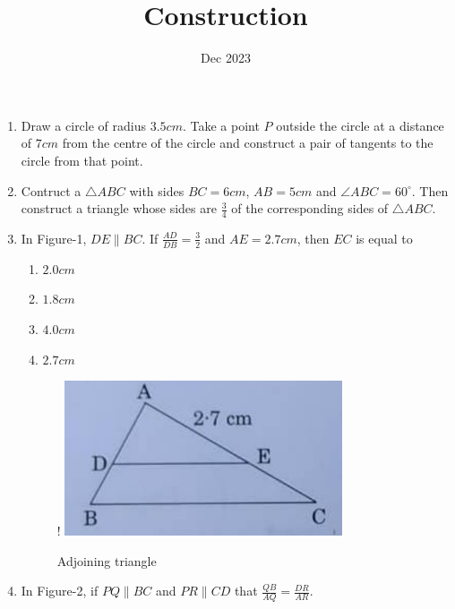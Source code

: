 \documentclass[12pt,-letter paper]{article}
\title{Construction}
\date{Dec 2023}
\begin{document}
\maketitle
\begin{enumerate}
\item Draw a circle of radius $3.5 cm$. Take a point $P$ outside the circle at a distance of $7 cm$ from the centre of the circle and construct a pair of tangents to the circle from that point.

\item Contruct a $\triangle ABC $ with sides $BC = 6 cm$, $AB = 5 cm$ and $\angle ABC = 60^{\circ}$. Then construct a triangle whose sides are $\frac{3}{4}$ of the corresponding sides of $\triangle ABC$.

\item In Figure-1, $DE \parallel BC $. If $\frac{AD}{DB}=\frac{3}{2}$ and $AE = 2.7 cm$, then $EC$ is equal to
\begin{enumerate}
		\item $2.0 cm$ 
                \item $1.8 cm$ 
                \item $4.0 cm$
                \item $2.7 cm$
\end{enumerate}
	\begin{figure}[!ht]
  \begin{center}
   {!} {
  \includegraphics[width=\columnwidth]{figs/Construction-1.jpg}}
  \end{center}
  \caption{Adjoining triangle}
  \label{fig:Construction-1.jpg}
\end{figure}
\item In Figure-2, if $PQ \parallel BC$ and $PR \parallel CD$ that $\frac{QB}{AQ} = \frac{DR}{AR}$.
	\begin{figure}[!ht]

\end{figure}
\end{enumerate}
\end{document}
